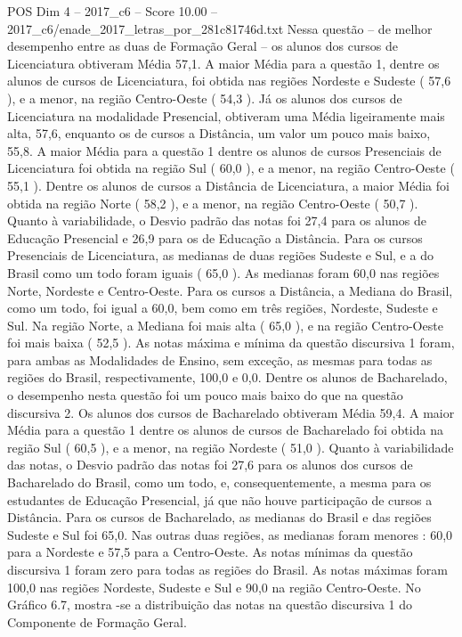 \begin{textsample}{POS Dim 4 – 2017\_c6 – Score 10.00 – 2017\_c6/enade\_2017\_letras\_por\_281c81746d.txt}
Nessa questão – de melhor desempenho entre as duas de Formação Geral – os alunos dos cursos de Licenciatura obtiveram Média 57,1.
A maior Média para a questão 1, dentre os alunos de cursos de Licenciatura, foi obtida nas regiões Nordeste e Sudeste ( 57,6 ), e a menor, na região Centro-Oeste ( 54,3 ).
Já os alunos dos cursos de Licenciatura na modalidade Presencial, obtiveram uma Média ligeiramente mais alta, 57,6, enquanto os de cursos a Distância, um valor um pouco mais baixo, 55,8.
A maior Média para a questão 1 dentre os alunos de cursos Presenciais de Licenciatura foi obtida na região Sul ( 60,0 ), e a menor, na região Centro-Oeste ( 55,1 ).
Dentre os alunos de cursos a Distância de Licenciatura, a maior Média foi obtida na região Norte ( 58,2 ), e a menor, na região Centro-Oeste ( 50,7 ).
Quanto à variabilidade, o Desvio padrão das notas foi 27,4 para os alunos de Educação Presencial e 26,9 para os de Educação a Distância.
Para os cursos Presenciais de Licenciatura, as medianas de duas regiões Sudeste e Sul, e a do Brasil como um todo foram iguais ( 65,0 ).
As medianas foram 60,0 nas regiões Norte, Nordeste e Centro-Oeste.
Para os cursos a Distância, a Mediana do Brasil, como um todo, foi igual a 60,0, bem como em três regiões, Nordeste, Sudeste e Sul.
Na região Norte, a Mediana foi mais alta ( 65,0 ), e na região Centro-Oeste foi mais baixa ( 52,5 ).
As notas máxima e mínima da questão discursiva 1 foram, para ambas as Modalidades de Ensino, sem exceção, as mesmas para todas as regiões do Brasil, respectivamente, 100,0 e 0,0.
Dentre os alunos de Bacharelado, o desempenho nesta questão foi um pouco mais baixo do que na questão discursiva 2.
Os alunos dos cursos de Bacharelado obtiveram Média 59,4.
A maior Média para a questão 1 dentre os alunos de cursos de Bacharelado foi obtida na região Sul ( 60,5 ), e a menor, na região Nordeste ( 51,0 ).
Quanto à variabilidade das notas, o Desvio padrão das notas foi 27,6 para os alunos dos cursos de Bacharelado do Brasil, como um todo, e, consequentemente, a mesma para os estudantes de Educação Presencial, já que não houve participação de cursos a Distância.
Para os cursos de Bacharelado, as medianas do Brasil e das regiões Sudeste e Sul foi 65,0.
Nas outras duas regiões, as medianas foram menores : 60,0 para a Nordeste e 57,5 para a Centro-Oeste.
As notas mínimas da questão discursiva 1 foram zero para todas as regiões do Brasil.
As notas máximas foram 100,0 nas regiões Nordeste, Sudeste e Sul e 90,0 na região Centro-Oeste.
No Gráfico 6.7, mostra -se a distribuição das notas na questão discursiva 1 do Componente de Formação Geral.

\end{textsample}

